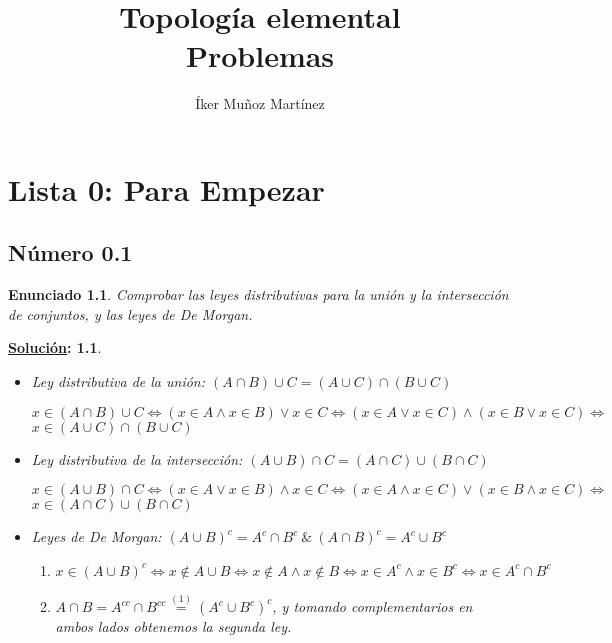 \documentclass[10pt,a4paper,openright]{book}
\title{Topología elemental \\ Problemas}
\author{Íker Muñoz Martínez}
\date{}
\theoremstyle{break}
\newtheorem*{enun}{Enunciado}
\newtheorem*{ej}{\underline{Solución}:}
\begin{document}
\maketitle
\setcounter{tocdepth}{3}%
\tableofcontents
\chapter{Lista 0: Para Empezar}%
\label{cha:lista0}

\section{Número 0.1}
\begin{enun}
Comprobar las leyes distributivas para la unión y la intersección de conjuntos, y las leyes de De Morgan.
\end{enun}
\begin{ej}
\begin{itemize}
\item Ley distributiva de la unión: $(A \cap B) \cup C = (A \cup C) \cap (B \cup C)$

$x \in (A \cap B) \cup C \Leftrightarrow (x \in A \wedge x \in B) \vee x \in C \Leftrightarrow (x \in A \vee x \in C) \wedge (x \in B \vee x \in C) \Leftrightarrow$ $x \in (A \cup C) \cap (B \cup C)$
\item Ley distributiva de la intersección: $(A \cup B) \cap C = (A \cap C) \cup (B \cap C)$

$x \in (A \cup B) \cap C \Leftrightarrow (x \in A \vee x \in B) \wedge x \in C \Leftrightarrow (x \in A \wedge x \in C) \vee (x \in B \wedge x \in C) \Leftrightarrow$ $x \in (A \cap C) \cup (B \cap C)$
\item Leyes de De Morgan: $(A \cup B)^c = A^c \cap B^c \ \& \ (A \cap B)^c = A^c \cup B^c$
\begin{enumerate}[label={(\arabic*)}]
\item $x \in (A \cup B)^c \Leftrightarrow x \notin A \cup B \Leftrightarrow x \notin A \wedge x \notin B \Leftrightarrow x \in A^c \wedge x \in B^c \Leftrightarrow x \in A^c \cap B^c$
\item $A \cap B = A^{cc} \cap B^{cc} \overset{(1)}{=} (A^c \cup B^c)^c$, y tomando complementarios en ambos lados obtenemos la segunda ley.
\end{enumerate}
\end{itemize}
\end{ej}
\end{document}
